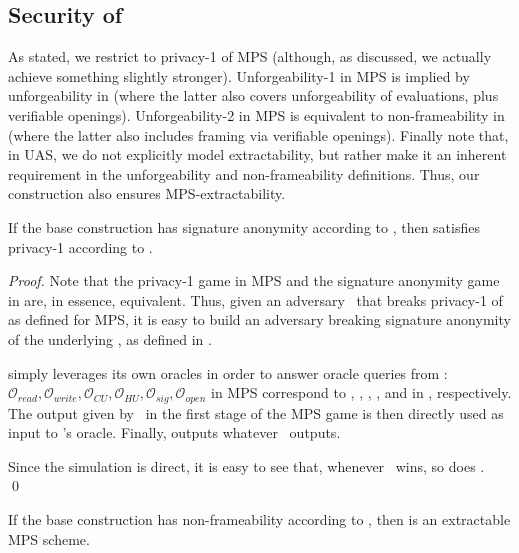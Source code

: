 \subsection{Security of \CUASMPS}

As stated, we restrict to privacy-1 of MPS (although, as discussed, we actually
achieve something slightly stronger). Unforgeability-1 in MPS is
implied by unforgeability in \UAS (where the latter also covers unforgeability
of \fissue evaluations, plus verifiable openings). Unforgeability-2 in MPS is
equivalent to non-frameability in \UAS (where the latter also includes
framing via verifiable openings). Finally note that, in UAS, we do not
explicitly model extractability, but rather make it an inherent requirement in
the unforgeability and non-frameability definitions. Thus, our \CUASMPS
construction also ensures MPS-extractability.

\begin{theorem}
  If the base \CUASGen construction has signature anonymity according to
  , then \CUASMPS satisfies privacy-1
  according to \cite{ngsy22}.
\end{theorem}

\begin{proof}  
  Note that the privacy-1 game in MPS and the signature anonymity game in \UAS
  are, in essence, equivalent. Thus, given an adversary \adv~that breaks
  privacy-1 of \CUASMPS as defined for MPS, it is easy to build an adversary
  \advB breaking signature anonymity of the underlying \CUASGen, as defined in
  \UAS.

  \advB simply leverages its own oracles in order to answer oracle queries from
  \adv: $\mathcal{O}_{read},\mathcal{O}_{write},\mathcal{O}_{CU},\mathcal{O}_{HU},
  \mathcal{O}_{sig},\mathcal{O}_{open}$ in MPS correspond to \RREG, \WREG,
  \CUGEN, \HUGEN, \SIGN and \OPEN in \UAS, respectively. The output given by
  \adv~in the first stage of the MPS game is then directly used as input to
  \advB's \CHALb oracle. Finally, \advB outputs whatever \adv~outputs.

  Since the simulation is direct, it is easy to see that, whenever \adv~wins,
  so does \advB.
  \qed
\end{proof}

\begin{theorem}
  If the base \CUASGen construction has non-frameability according to
  , then \CUASMPS is an extractable MPS scheme.
\end{theorem}


